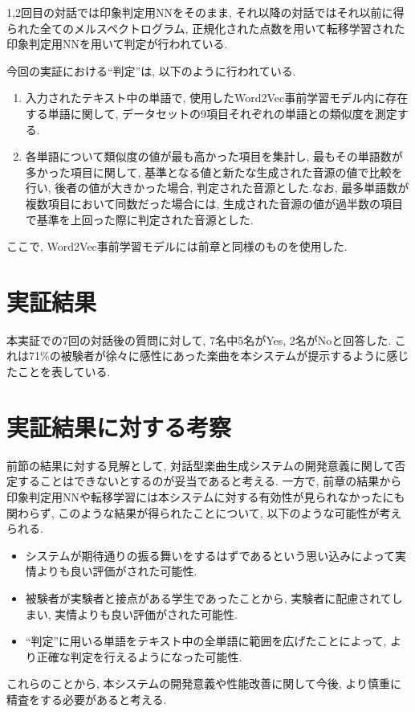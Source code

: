 \documentclass[a4paper,11pt,dvipdfmx]{jreport}
\begin{document}
1,2回目の対話では印象判定用NNをそのまま, それ以降の対話ではそれ以前に得られた全てのメルスペクトログラム, 正規化された点数を用いて転移学習された印象判定用NNを用いて判定が行われている.

今回の実証における``判定''は, 以下のように行われている.
\begin{enumerate}
  \item 入力されたテキスト中の単語で, 使用したWord2Vec事前学習モデル内に存在する単語に関して, 
        データセットの9項目それぞれの単語との類似度を測定する.
  \item 各単語について類似度の値が最も高かった項目を集計し, 
        最もその単語数が多かった項目に関して, 
        基準となる値と新たな生成された音源の値で比較を行い, 後者の値が大きかった場合, 
        判定された音源とした.なお, 最多単語数が複数項目において同数だった場合には, 生成された音源の値が過半数の項目で基準を上回った際に判定された音源とした.
\end{enumerate}
ここで, Word2Vec事前学習モデルには前章と同様のものを使用した.

\section{実証結果}
本実証での7回の対話後の質問に対して, 7名中5名がYes, 2名がNoと回答した.
これは71\%の被験者が徐々に感性にあった楽曲を本システムが提示するように感じたことを表している.

\section{実証結果に対する考察}
前節の結果に対する見解として, 対話型楽曲生成システムの開発意義に関して否定することはできないとするのが妥当であると考える.
一方で, 前章の結果から印象判定用NNや転移学習には本システムに対する有効性が見られなかったにも関わらず, このような結果が得られたことについて, 以下のような可能性が考えられる.
\begin{itemize}
  \item システムが期待通りの振る舞いをするはずであるという思い込みによって実情よりも良い評価がされた可能性.
  \item 被験者が実験者と接点がある学生であったことから, 実験者に配慮されてしまい, 実情よりも良い評価がされた可能性.
  \item ``判定''に用いる単語をテキスト中の全単語に範囲を広げたことによって, より正確な判定を行えるようになった可能性.
\end{itemize}
これらのことから, 本システムの開発意義や性能改善に関して今後, より慎重に精査をする必要があると考える.
\end{document}
